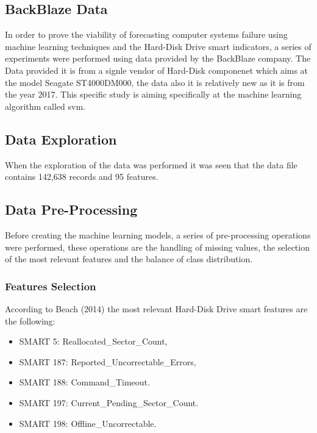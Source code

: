 
\setlength{\parindent}{1.5em}
\subsection{BackBlaze Data}

In order to prove the viability of forecasting computer systems failure using machine learning techniques and the
Hard-Disk Drive \acrfull{smart} indicators, a series of experiments were performed using data provided by the
BackBlaze company. The Data provided it is from a signle vendor of Hard-Disk componenet which aims at the model
Seagate ST4000DM000, the data also it is relatively new as it is from the year 2017.
This specific study is aiming specifically at the machine learning algorithm
called \acrfull{svm}.

\subsection{Data Exploration}

When the exploration of the data was performed it was seen that the data file contains 142,638 records and 95 features.

\subsection{Data Pre-Processing}

Before creating the machine learning models, a series of pre-processing operations were performed, these
operations are the handling of missing values, the selection of the most relevant features and
the balance of class distribution.

\subsubsection{Features Selection}

According to Beach (2014) the most relevant Hard-Disk Drive \acrfull{smart} features are the following:

\begin{itemize}
    \item SMART 5:   Reallocated\_Sector\_Count,
    \item SMART 187: Reported\_Uncorrectable\_Errors,
    \item SMART 188: Command\_Timeout.
    \item SMART 197: Current\_Pending\_Sector\_Count.
    \item SMART 198: Offline\_Uncorrectable.
\end{itemize}

